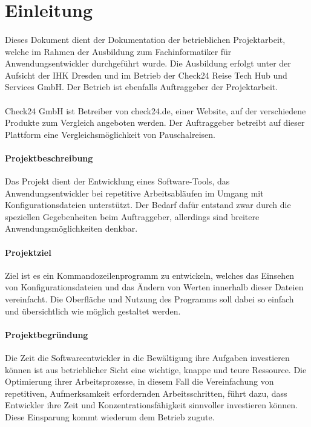 \section{Einleitung}
\paragraph{}
Dieses Dokument dient der Dokumentation der betrieblichen Projektarbeit, welche
im Rahmen der Ausbildung zum Fachinformatiker für Anwendungsentwickler durchgeführt
wurde. Die Ausbildung erfolgt unter der Aufsicht der IHK Dresden und im Betrieb
der Check24 Reise Tech Hub und Services GmbH. Der Betrieb ist ebenfalls
Auftraggeber der Projektarbeit.

\paragraph{}
Check24 GmbH ist Betreiber von check24.de, einer Website, auf der verschiedene
Produkte zum Vergleich angeboten werden. Der Auftraggeber betreibt auf dieser
Plattform eine Vergleichsmöglichkeit von Pauschalreisen.

\paragraph{Projektbeschreibung}
Das Projekt dient der Entwicklung eines Software-Tools, das Anwendungsentwickler
bei repetitive Arbeitsabläufen im Umgang mit Konfigurationsdateien unterstützt.
Der Bedarf dafür entstand zwar durch die speziellen Gegebenheiten beim Auftraggeber,
allerdings sind breitere Anwendungsmöglichkeiten denkbar.

\paragraph{Projektziel}
Ziel ist es ein Kommandozeilenprogramm zu entwickeln, welches das Einsehen von
Konfigurationsdateien und das Ändern von Werten innerhalb dieser Dateien vereinfacht.
Die Oberfläche und Nutzung des Programms soll dabei so einfach und übersichtlich
wie möglich gestaltet werden.

\paragraph{Projektbegründung}
Die Zeit die Softwareentwickler in die Bewältigung ihre Aufgaben investieren können
ist aus betrieblicher Sicht eine wichtige, knappe und teure Ressource. Die
Optimierung ihrer Arbeitsprozesse, in diesem Fall die Vereinfachung von repetitiven,
Aufmerksamkeit erfordernden Arbeitsschritten, führt dazu, dass Entwickler ihre
Zeit und Konzentrationsfähigkeit sinnvoller investieren können. Diese Einsparung
kommt wiederum dem Betrieb zugute.

